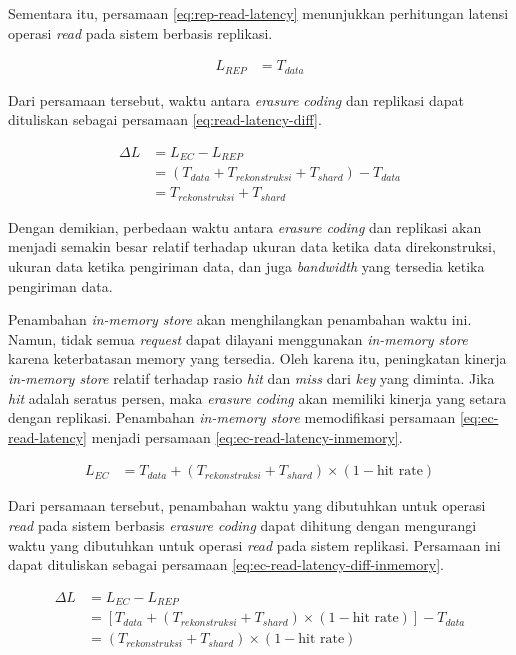 \begin{enumerate}
  Sementara itu, persamaan \ref{eq:rep-read-latency} menunjukkan perhitungan latensi operasi \textit{read} pada sistem berbasis replikasi.

  \begin{align}
  L_{REP} &= T_{data}
  \label{eq:rep-read-latency}
  \end{align}

  Dari persamaan tersebut, waktu antara \textit{erasure coding} dan replikasi dapat dituliskan sebagai persamaan \ref{eq:read-latency-diff}.

  \begin{align}
  \Delta L &= L_{EC} - L_{REP} \\
  &= (T_{data} + T_{rekonstruksi} + T_{shard}) - T_{data} \\
  &= T_{rekonstruksi} + T_{shard}
  \label{eq:read-latency-diff}
  \end{align}

  Dengan demikian, perbedaan waktu antara \textit{erasure coding} dan replikasi akan menjadi semakin besar relatif terhadap ukuran data ketika data direkonstruksi, ukuran data ketika pengiriman data, dan juga \textit{bandwidth} yang tersedia ketika pengiriman data.
  
  Penambahan \textit{in-memory store} akan menghilangkan penambahan waktu ini. Namun, tidak semua \textit{request} dapat dilayani menggunakan \textit{in-memory store} karena keterbatasan memory yang tersedia. Oleh karena itu, peningkatan kinerja \textit{in-memory store} relatif terhadap rasio \textit{hit} dan \textit{miss} dari \textit{key} yang diminta. Jika \textit{hit} adalah seratus persen, maka \textit{erasure coding} akan memiliki kinerja yang setara dengan replikasi. Penambahan \textit{in-memory store} memodifikasi persamaan \ref{eq:ec-read-latency} menjadi persamaan \ref{eq:ec-read-latency-inmemory}.

  \begin{align}
    L_{EC} &= T_{data} + (T_{rekonstruksi} + T_{shard}) \times (1 - \text{hit rate})
    \label{eq:ec-read-latency-inmemory}
  \end{align}

  Dari persamaan tersebut, penambahan waktu yang dibutuhkan untuk operasi \textit{read} pada sistem berbasis \textit{erasure coding} dapat dihitung dengan mengurangi waktu yang dibutuhkan untuk operasi \textit{read} pada sistem replikasi. Persamaan ini dapat dituliskan sebagai persamaan \ref{eq:ec-read-latency-diff-inmemory}.

  \begin{align}
    \Delta L &= L_{EC} - L_{REP} \\
    &= \left[T_{data} + (T_{rekonstruksi} + T_{shard}) \times (1 - \text{hit rate})\right] - T_{data} \\
    &= (T_{rekonstruksi} + T_{shard}) \times (1 - \text{hit rate})
    \label{eq:ec-read-latency-diff-inmemory}
  \end{align}


\end{enumerate}
